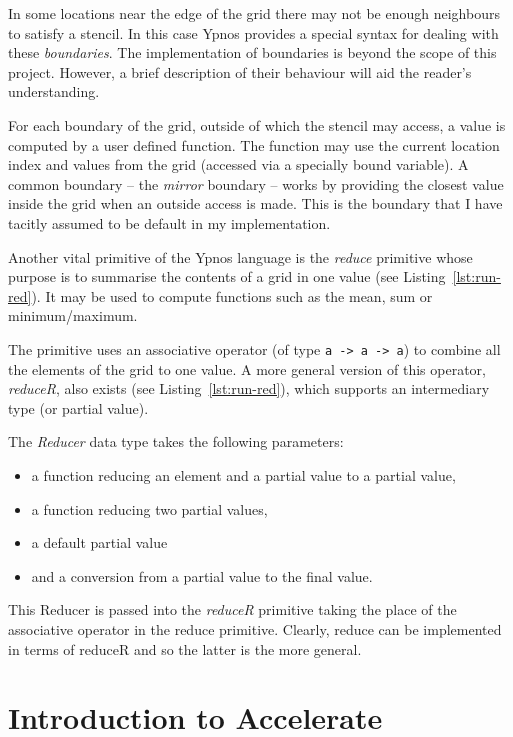 \documentclass[
    12pt,
    a4paper,
    twoside,
    openright,
    ]{scrbook}
\begin{document}
In some locations near the edge of the grid there may not be enough neighbours
to satisfy a stencil. In this case Ypnos provides a special syntax for dealing
with these \emph{boundaries}. The implementation of boundaries is beyond the
scope of this project. However, a brief description of their behaviour will aid
the reader's understanding.

For each boundary of the grid, outside of which the stencil may access, a value
is computed by a user defined function. The function may use the current
location index and values from the grid (accessed via a specially bound
variable). A common boundary -- the \emph{mirror} boundary -- works by providing
the closest value inside the grid when an outside access is made. This is the
boundary that I have tacitly assumed to be default in my implementation.

Another vital primitive of the Ypnos language is the \emph{reduce} primitive
whose purpose is to summarise the contents of a grid in one value (see
Listing~\ref{lst:run-red}). It may be used to compute functions such as the mean,
sum or minimum/maximum.

The primitive uses an associative operator (of type \texttt{a -> a -> a}) to
combine all the elements of the grid to one value. A more general version of
this operator, \emph{reduceR}, also exists (see Listing~\ref{lst:run-red}),
which supports an intermediary type (or partial value).

The \emph{Reducer} data type takes the following parameters:

\begin{itemize}
\itemsep1pt\parskip0pt
\item
  a function reducing an element and a partial value to a partial value,
\item
  a function reducing two partial values,
\item
  a default partial value
\item
  and a conversion from a partial value to the final value.
\end{itemize}

This Reducer is passed into the \emph{reduceR} primitive taking the place of the
associative operator in the reduce primitive. Clearly, reduce can be implemented
in terms of reduceR and so the latter is the more general.

\section{Introduction to Accelerate}
\label{sec:intr-axle}
\end{document}
